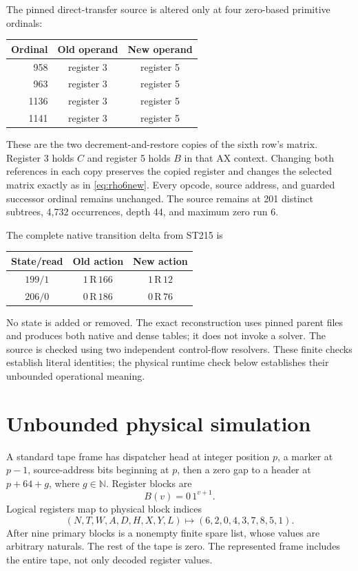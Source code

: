 \documentclass[11pt,a4paper]{article}
\theoremstyle{definition}
\newcommand{\N}{\mathbb N}
\newcommand{\rowact}[3]{#1\,\mathrm{#2}\,#3}
\numberwithin{equation}{section}
\begin{document}
The pinned direct-transfer source is altered only at four zero-based
primitive ordinals:
\begin{center}
\begin{tabular}{rcc}
\toprule
Ordinal & Old operand & New operand\\
\midrule
958 & register 3 & register 5\\
963 & register 3 & register 5\\
1136 & register 3 & register 5\\
1141 & register 3 & register 5\\
\bottomrule
\end{tabular}
\end{center}
These are the two decrement-and-restore copies of the sixth row's
matrix. Register 3 holds $C$ and register 5 holds $B$ in that AX
context. Changing both references in each copy preserves the copied
register and changes the selected matrix exactly as in
\eqref{eq:rho6new}. Every opcode, source address, and guarded successor
ordinal remains unchanged. The source remains at 201 distinct subtrees,
4,732 occurrences, depth 44, and maximum zero run 6.

The complete native transition delta from ST215 is
\begin{center}
\begin{tabular}{ccc}
\toprule
State/read & Old action & New action\\
\midrule
$199/1$ & $\rowact{1}{R}{166}$ & $\rowact{1}{R}{12}$\\
$206/0$ & $\rowact{0}{R}{186}$ & $\rowact{0}{R}{76}$\\
\bottomrule
\end{tabular}
\end{center}
No state is added or removed. The exact reconstruction uses pinned
parent files and produces both native and dense tables; it does not
invoke a solver. The source is checked using two independent control-flow
resolvers. These finite checks establish literal identities; the physical
runtime check below establishes their unbounded operational meaning.

\section{Unbounded physical simulation}
\label{sec:physical}

A standard tape frame has dispatcher head at integer position $p$,
a marker at $p-1$, source-address bits beginning at $p$, then a zero
gap to a header at $p+64+g$, where $g\in\N$. Register blocks are
\[
 B(v)=0\,1^{v+1}.
\]
Logical registers map to physical block indices
\[
 (N,T,W,A,D,H,X,Y,L)\longmapsto(6,2,0,4,3,7,8,5,1).
\]
After nine primary blocks is a nonempty finite spare list, whose values
are arbitrary naturals. The rest of the tape is zero. The represented
frame includes the entire tape, not only decoded register values.
\end{document}
